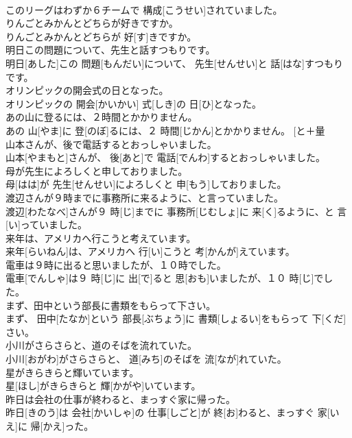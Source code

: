 \documentclass[8pt]{extreport}
\begin{document}
\begin{CJK}{UTF8}{min}
\\	このリーグはわずか６チームで 構成[こうせい]されていました。	
\\	りんごとみかんとどちらが好きですか。	
\\	りんごとみかんとどちらが 好[す]きですか。	
\\	明日この問題について、先生と話すつもりです。	
\\	明日[あした]この 問題[もんだい]について、 先生[せんせい]と 話[はな]すつもりです。	
\\	オリンピックの開会式の日となった。	
\\	オリンピックの 開会[かいかい] 式[しき]の 日[ひ]となった。	
\\	あの山に登るには、２時間とかかりません。	
\\	あの 山[やま]に 登[のぼ]るには、２ 時間[じかん]とかかりません。	[と＋量 
\\	山本さんが、後で電話するとおっしゃいました。	
\\	山本[やまもと]さんが、 後[あと]で 電話[でんわ]するとおっしゃいました。	
\\	母が先生によろしくと申しておりました。	
\\	母[はは]が 先生[せんせい]によろしくと 申[もう]しておりました。	
\\	渡辺さんが９時までに事務所に来るように、と言っていました。	
\\	渡辺[わたなべ]さんが９ 時[じ]までに 事務所[じむしょ]に 来[く]るように、と 言[い]っていました。	
\\	来年は、アメリカへ行こうと考えています。	
\\	来年[らいねん]は、アメリカへ 行[い]こうと 考[かんが]えています。	
\\	電車は９時に出ると思いましたが、１０時でした。	
\\	電車[でんしゃ]は９ 時[じ]に 出[で]ると 思[おも]いましたが、１０ 時[じ]でした。	
\\	まず、田中という部長に書類をもらって下さい。	
\\	まず、 田中[たなか]という 部長[ぶちょう]に 書類[しょるい]をもらって 下[くだ]さい。	
\\	小川がさらさらと、道のそばを流れていた。	
\\	小川[おがわ]がさらさらと、 道[みち]のそばを 流[なが]れていた。	
\\	星がきらきらと輝いています。	
\\	星[ほし]がきらきらと 輝[かがや]いています。	
\\	昨日は会社の仕事が終わると、まっすぐ家に帰った。	
\\	昨日[きのう]は 会社[かいしゃ]の 仕事[しごと]が 終[お]わると、まっすぐ 家[いえ]に 帰[かえ]った。	

\end{CJK}
\end{document}
